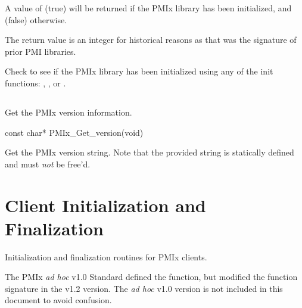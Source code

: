 A value of  (true) will be returned if the \ac{PMIx} library has been initialized, and  (false) otherwise.

\rationalestart
The return value is an integer for historical reasons as that was the signature of prior PMI libraries.
\rationaleend

\descr

Check to see if the \ac{PMIx} library has been initialized using any of the init functions:
, , or .

\subsection{}

\summary

Get the \ac{PMIx} version information.

\format

\cspecificstart
\begin{codepar}
const char* PMIx_Get_version(void)
\end{codepar}
\cspecificend

\descr

Get the \ac{PMIx} version string.
Note that the provided string is statically defined and must \textit{not} be free'd.

\section{Client Initialization and Finalization}
\label{chap:api_init:client}

Initialization and finalization routines for \ac{PMIx} clients.

\adviceuserstart
The \ac{PMIx} \textit{ad hoc} v1.0 Standard defined the  function, but modified the function signature in the v1.2 version. The \textit{ad hoc} v1.0 version is not included in this document to avoid confusion.
\adviceuserend


\subsection{}

\summary

